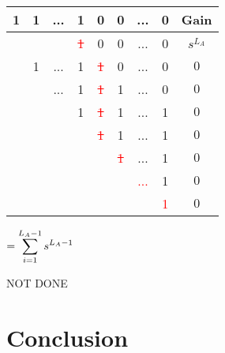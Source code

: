 \documentclass[english,12pt,a4paper,final]{article}
\begin{document}
\begin{tabular}{|cccccccc|c|}
	\hline
	1 & 1 & ... & 1 & 0 & 0 & ... & 0 & Gain \\
	\hline
	
	& & & \textcolor{red}{\sout{1}} & 0 & 0 & ... & 0 & $s^{L_A}$\\
	
	& \textcolor{OliveGreen}{1} & \textcolor{OliveGreen}{...} & \textcolor{OliveGreen}{1} & \textcolor{red}{\sout{1}} & 0 & ... & 0 & $0$ \\
	
	&  & \textcolor{OliveGreen}{...} & \textcolor{OliveGreen}{1} & \textcolor{red}{\sout{1}} & 1 & ... & 0 & $0$ \\
	
	&  &  & \textcolor{OliveGreen}{1} & \textcolor{red}{\sout{1}} & 1 & ... & 1 & $0$ \\
	
	&  &  &  & \textcolor{red}{\sout{1}} & 1 & ... & 1 & $0$ \\
	
	&  &  &  &  & \textcolor{red}{\sout{1}} & ... & 1 & $0$ \\
	
	&  &  &  &  &  & \textcolor{red}{...} & 1 & $0$ \\
	
	&  &  &  &  &  &  & \textcolor{red}{1} & $0$ \\
	\hline
\end{tabular}
$=\mathlarger{\sum_{i=1}^{L_A-1}s^{L_A-1}}$

NOT DONE

\part {Conclusion}
\end{document}
